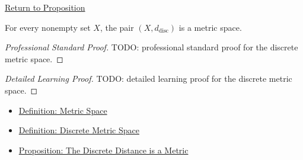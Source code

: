 \newpage
{}
\label{prf:discrete-metric-space-instance}

\begin{remark*}[Return]
\hyperref[prop:discrete-metric-space-instance]{Return to Proposition}
\end{remark*}

\begin{proposition*}
For every nonempty set \(X\), the pair \((X,d_{\mathrm{disc}})\) is a metric
space.
\end{proposition*}

\begin{proof}[Professional Standard Proof]
\LRAProofBodyStart
TODO: professional standard proof for the discrete metric space.
\end{proof}

\begin{proof}[Detailed Learning Proof]
\LRAProofBodyStart
TODO: detailed learning proof for the discrete metric space.
\end{proof}

\begin{remark*}
\end{remark*}

\begin{dependencies}
\begin{itemize}
  \item \hyperref[def:metric-space]{Definition: Metric Space}
  \item \hyperref[def:discrete-metric-space]{Definition: Discrete Metric Space}
  \item \hyperref[prop:discrete-metric-space]{Proposition: The Discrete Distance is a Metric}
\end{itemize}
\end{dependencies}

\clearpage
